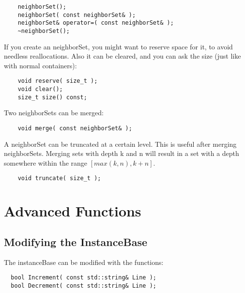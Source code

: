 \documentclass{report}
\begin{document}
\begin{footnotesize}
\begin{verbatim}
    neighborSet();
    neighborSet( const neighborSet& );
    neighborSet& operator=( const neighborSet& );
    ~neighborSet();
\end{verbatim}
\end{footnotesize}

If you create an neighborSet, you might want to reserve space for it,
to avoid needless reallocations. Also it can be cleared, and you can
ask the size (just like with normal containers):

\begin{footnotesize}
\begin{verbatim}
    void reserve( size_t );
    void clear();
    size_t size() const;
\end{verbatim}
\end{footnotesize}

Two neighborSets can be merged:

\begin{footnotesize}
\begin{verbatim}
    void merge( const neighborSet& );
\end{verbatim}
\end{footnotesize}

A neighborSet can be truncated at a certain level. This is useful
after merging neighborSets. Merging sets with depth k and n will
result in a set with a depth somewhere within the range $[max(k,n), k+n]$.

\begin{footnotesize}
\begin{verbatim}
    void truncate( size_t );
\end{verbatim}
\end{footnotesize}

\chapter{Advanced Functions}

\section{Modifying the InstanceBase}

The instanceBase can be modified with the functions:

\begin{footnotesize}
\begin{verbatim}
  bool Increment( const std::string& Line ); 
  bool Decrement( const std::string& Line ); 
\end{verbatim}
\end{footnotesize}
\end{document}
